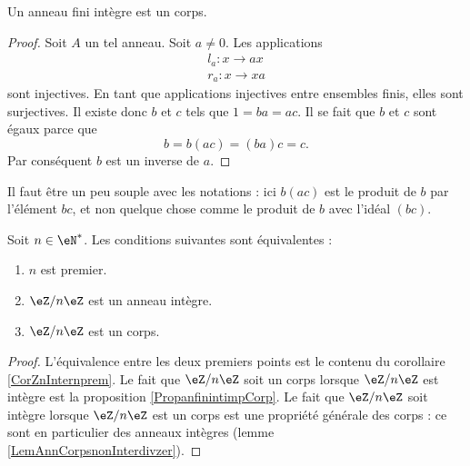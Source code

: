 \begin{proposition}     \label{PropanfinintimpCorp}
    Un anneau fini intègre est un corps.
\end{proposition}

\begin{proof}
    Soit \( A\) un tel anneau. Soit \( a\neq 0\). Les applications 
    \begin{subequations}
        \begin{align}
            l_a\colon x\to ax\\
            r_a\colon x\to xa
        \end{align}
    \end{subequations}
    sont injectives. En tant que applications injectives entre ensembles finis, elles sont surjectives. Il existe donc \( b\) et \( c\) tels que \( 1=ba=ac\). Il se fait que \( b\) et \( c\) sont égaux parce que
    \begin{equation}
        b=b(ac)=(ba)c=c.
    \end{equation}
    Par conséquent \( b\) est un inverse de \( a\).
\end{proof}

Il faut être un peu souple avec les notations : ici \( b(ac)\) est le produit de \( b\) par l'élément \( bc\), et non quelque chose comme le produit de \( b\) avec l'idéal \( (bc)\).

\begin{proposition}     \label{PropzhFgNJ}
    Soit \( n\in\eN^*\). Les conditions suivantes sont équivalentes :
    \begin{enumerate}
        \item
            \( n\) est premier.
        \item
            \( \eZ/n\eZ\) est un anneau intègre.
        \item
            \( \eZ/n\eZ\) est un corps.
    \end{enumerate}
\end{proposition}

\begin{proof}
    L'équivalence entre les deux premiers points est le contenu du corollaire \ref{CorZnInternprem}. Le fait que \( \eZ/n\eZ\) soit un corps lorsque \( \eZ/n\eZ\) est intègre est la proposition \ref{PropanfinintimpCorp}. Le fait que \( \eZ/n\eZ\) soit intègre lorsque \( \eZ/n\eZ\) est un corps est une propriété générale des corps : ce sont en particulier des anneaux intègres (lemme \ref{LemAnnCorpsnonInterdivzer}).
\end{proof}

